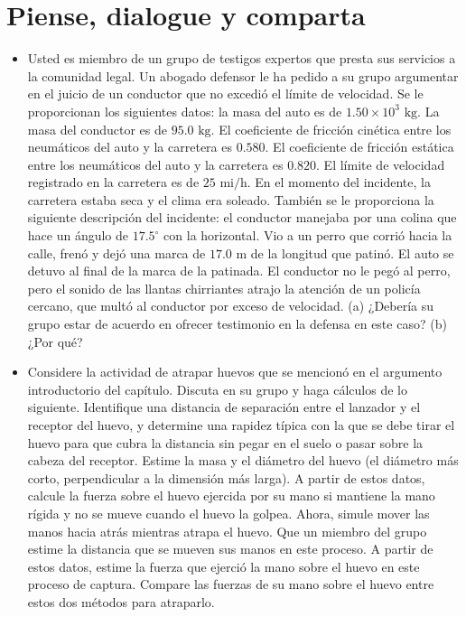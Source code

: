 \documentclass[11pt,a4paper]{article}
\begin{document}
\section*{Piense, dialogue y comparta}

\begin{itemize}
    \item[\textbf{1.}] Usted es miembro de un grupo de testigos expertos que presta sus servicios a la comunidad legal. Un abogado defensor le ha pedido a su grupo argumentar en el juicio de un conductor que no excedió el límite de velocidad. Se le proporcionan los siguientes datos: la masa del auto es de $1.50 \times 10^3 \text{ kg}$. La masa del conductor es de $95.0 \text{ kg}$. El coeficiente de fricción cinética entre los neumáticos del auto y la carretera es $0.580$. El coeficiente de fricción estática entre los neumáticos del auto y la carretera es $0.820$. El límite de velocidad registrado en la carretera es de $25 \text{ mi/h}$. En el momento del incidente, la carretera estaba seca y el clima era soleado. También se le proporciona la siguiente descripción del incidente: el conductor manejaba por una colina que hace un ángulo de $17.5^\circ$ con la horizontal. Vio a un perro que corrió hacia la calle, frenó y dejó una marca de $17.0 \text{ m}$ de la longitud que patinó. El auto se detuvo al final de la marca de la patinada. El conductor no le pegó al perro, pero el sonido de las llantas chirriantes atrajo la atención de un policía cercano, que multó al conductor por exceso de velocidad. (a) ¿Debería su grupo estar de acuerdo en ofrecer testimonio en la defensa en este caso? (b) ¿Por qué?
    \vspace*{9cm}

    \item[\textbf{2.}] Considere la actividad de atrapar huevos que se mencionó en el argumento introductorio del capítulo. Discuta en su grupo y haga cálculos de lo siguiente. Identifique una distancia de separación entre el lanzador y el receptor del huevo, y determine una rapidez típica con la que se debe tirar el huevo para que cubra la distancia sin pegar en el suelo o pasar sobre la cabeza del receptor. Estime la masa y el diámetro del huevo (el diámetro más corto, perpendicular a la dimensión más larga). A partir de estos datos, calcule la fuerza sobre el huevo ejercida por su mano si mantiene la mano rígida y no se mueve cuando el huevo la golpea. Ahora, simule mover las manos hacia atrás mientras atrapa el huevo. Que un miembro del grupo estime la distancia que se mueven sus manos en este proceso. A partir de estos datos, estime la fuerza que ejerció la mano sobre el huevo en este proceso de captura. Compare las fuerzas de su mano sobre el huevo entre estos dos métodos para atraparlo.
    \vspace*{8cm}


\end{itemize}
\end{document}

